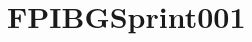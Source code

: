 \chapter{FPIBGSprint001}
\hypertarget{md__x_1_2_d_o_c_i_n_2_f_p_i_b_g_sprint001}{}\label{md__x_1_2_d_o_c_i_n_2_f_p_i_b_g_sprint001}








 